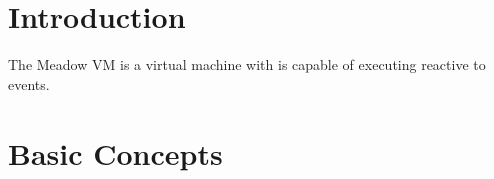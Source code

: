 \documentclass{pamsbook}
\begin{document}







\section{Introduction}
\noindent{}The Meadow VM is a virtual machine with is capable of executing
reactive to events.  

\section{Basic Concepts}
\end{document}
